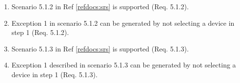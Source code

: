 \documentclass[a4paper]{article}
\newlength{\testlabellength}
\newenvironment{testlist}{\begin{enumerate}[label=\bfseries Instruction \thesubsection.\arabic* , labelindent=0pt, labelwidth=\testlabellength , leftmargin=2cm]}{\end{enumerate}}
\newenvironment{precondition}{
{\color{white}BLARG}\\ 
\textbf{Precondition}
\begin{itemize}[labelindent=0cm, labelwidth=2cm , leftmargin=1cm]
}
{\end{itemize}}
\newenvironment{instruction}{
\textbf{Instructions:}
\begin{enumerate}[label=\bfseries  \arabic*., labelindent=0cm, labelwidth=2cm , leftmargin=1cm]
}
{\end{enumerate}}
\newenvironment{postcondition}{
\textbf{Postcondition:}
\begin{itemize}[labelindent=0cm, labelwidth=2cm , leftmargin=1cm]
}
{\end{itemize}}
\begin{document}
\begin{appendices}
\begin{testlist}
	\item Scenario 5.1.2 in Ref \ref{refdocs:srs} is supported (Req. 5.1.2).

	\item Exception 1 in scenario 5.1.2 can be generated by not selecting a device in step 1 (Req. 5.1.2).

	\item Scenario 5.1.3 in Ref \ref{refdocs:srs} is supported (Req. 5.1.3).

	\item Exception 1 described in scenario 5.1.3 can be generated by not selecting a device in step 1 (Req. 5.1.3). 


\end{testlist}
\end{appendices}
\end{document}
